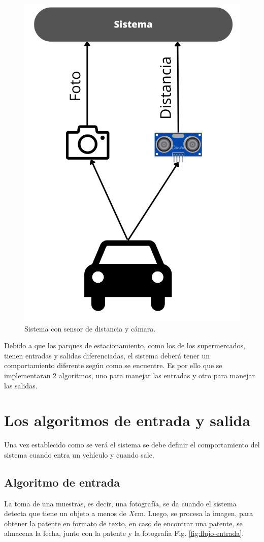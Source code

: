 \begin{figure}
    \centering
    \includegraphics[width=.3\textwidth]{imgs/sistema-con-sensor.png}
    \caption{Sistema con sensor de distancia y cámara.}
    \label{fig:sistema-completa}
\end{figure}

Debido a que los parques de estacionamiento, como los de los supermercados, tienen entradas y salidas diferenciadas, el sistema deberá tener un comportamiento diferente según como se encuentre. Es por ello que se implementaran 2 algoritmos, uno para manejar las entradas y otro para manejar las salidas.

\section{Los algoritmos de entrada y salida}

Una vez establecido como se verá el sistema se debe definir el comportamiento del sistema cuando entra un vehículo y cuando sale.

\subsection{Algoritmo de entrada}

La toma de una muestras, es decir, una fotografía, se da cuando el sistema detecta que tiene un objeto a menos de $X$cm. Luego, se procesa la imagen, para obtener la patente en formato de texto, en caso de encontrar una patente, se almacena la fecha, junto con la patente y la fotografía Fig. \ref{fig:flujo-entrada}.


